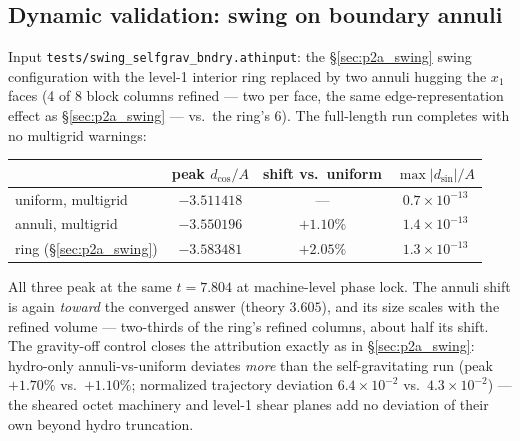 \documentclass[11pt]{article}
\newcommand{\code}[1]{\texttt{#1}}
\begin{document}
\subsection{Dynamic validation: swing on boundary annuli}
\label{sec:p2b_swing}
Input \code{tests/swing\_selfgrav\_bndry.athinput}: the \S\ref{sec:p2a_swing} swing
configuration with the level-1 interior ring replaced by two annuli hugging the
$x_1$ faces (4 of 8 block columns refined --- two per face, the same
edge-representation effect as \S\ref{sec:p2a_swing} --- vs.\ the ring's 6). The
full-length run
completes with no multigrid warnings:
\begin{center}
\small
\begin{tabular}{@{}lccc@{}}
\toprule
 & peak $d_{\cos}/A$ & shift vs.\ uniform & $\max|d_{\sin}|/A$ \\
\midrule
uniform, multigrid  & $-3.511418$ & --- & $0.7\times10^{-13}$ \\
annuli, multigrid   & $-3.550196$ & $+1.10\%$ & $1.4\times10^{-13}$ \\
ring (\S\ref{sec:p2a_swing}) & $-3.583481$ & $+2.05\%$ & $1.3\times10^{-13}$ \\
\bottomrule
\end{tabular}
\end{center}
All three peak at the same $t = 7.804$ at machine-level phase lock. The annuli
shift is again \emph{toward} the converged answer (theory $3.605$), and its size
scales with the refined volume --- two-thirds of the ring's refined columns,
about half its shift. The gravity-off control closes the attribution exactly as in
\S\ref{sec:p2a_swing}: hydro-only annuli-vs-uniform deviates \emph{more} than the
self-gravitating run (peak $+1.70\%$ vs.\ $+1.10\%$; normalized trajectory
deviation $6.4\times10^{-2}$ vs.\ $4.3\times10^{-2}$) --- the sheared octet
machinery and level-1 shear planes add no deviation of their own beyond hydro
truncation.
\end{document}

